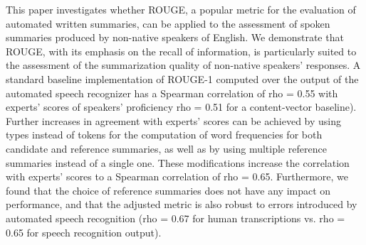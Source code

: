 This paper investigates whether ROUGE, a popular metric for the evaluation of automated written summaries, can be applied to the assessment of spoken summaries produced by non-native speakers of English. We demonstrate that ROUGE, with its emphasis on the recall of information, is particularly suited to the assessment of the summarization quality of non-native speakers' responses. A standard baseline implementation of ROUGE-1 computed over the output of the automated speech recognizer has a Spearman correlation of rho = 0.55 with experts' scores of speakers' proficiency  rho = 0.51 for a content-vector baseline). Further increases in agreement with experts' scores can be achieved by using types instead of tokens for the computation of word frequencies for both candidate and reference summaries, as well as by using multiple reference summaries instead of a single one. These modifications increase the correlation with experts' scores to a Spearman correlation of rho = 0.65. Furthermore, we found that the choice of reference summaries does not have any impact on performance, and that the adjusted metric is also robust to errors introduced by automated speech recognition (rho = 0.67 for human transcriptions vs. rho = 0.65 for speech recognition output).
